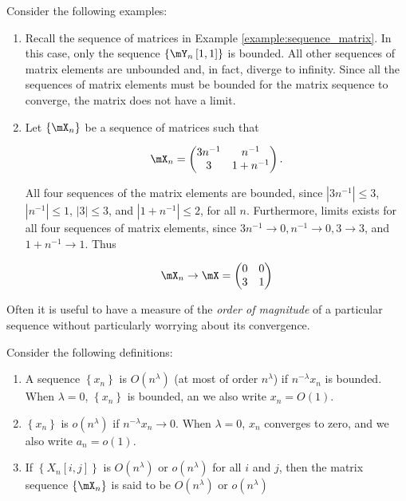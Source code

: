 \documentclass[english,12pt]{book}\usepackage[]{graphicx}\usepackage[]{xcolor}
\begin{document}
\begin{example}
Consider the following examples:
\begin{enumerate}
 \item Recall the sequence of matrices in Example \ref{example:sequence_matrix}. In this case, only the sequence $\left\lbrace \mY_n\left[1, 1\right]\right\rbrace$ is bounded. All other sequences of matrix elements are unbounded and, in fact, diverge to infinity. Since all the sequences of matrix elements must be bounded for the matrix sequence to converge, the matrix does not have a limit.
 \item Let $\left\lbrace \mX_n\right\rbrace$ be a sequence of matrices such that
 
\begin{equation*}
\mX_n = \begin{pmatrix}
  3n^{-1} & n^{-1} \\
  3       & 1 + n^{-1}
\end{pmatrix}.
\end{equation*}

All four sequences of the matrix elements are bounded, since $\left|3n^{-1}\right|\leq 3$, $\left|n^{-1}\right|\leq 1$, $\left|3\right|\leq 3$, and $\left|1 + n^{-1}\right|\leq 2$, for all $n$. Furthermore, limits exists for all four sequences of matrix elements, since $3n^{-1}\to 0, n^{-1}\to 0, 3\to 3$, and $1 + n^{-1}\to 1$. Thus 

\begin{equation*}
\mX_n\to \mX= \begin{pmatrix}
0 & 0 \\
3 & 1
\end{pmatrix}
\end{equation*}
 \end{enumerate}
\end{example}

Often it is useful to have a measure of the \emph{order of magnitude} of a particular sequence without particularly worrying about its convergence. 
\begin{definition}\label{definition:big_little_oh}
Consider the following definitions:
	\begin{enumerate}
		\item A sequence $\left\lbrace x_n \right\rbrace $ is $O(n^{\lambda})$ (at most of order $n^{\lambda}$) if $n^{-\lambda}x_n$ is bounded. When $\lambda=0$, $\left\lbrace x_n \right\rbrace $ is bounded, an we also write $x_n=O(1)$.
		\item $\left\lbrace x_n \right\rbrace $ is $o(n^{\lambda})$ if $n^{-\lambda}x_n\to 0$. When $\lambda=0$, $x_n$ converges to zero, and we also write $a_n=o(1)$.
		\item If $\left\lbrace X_n\left[i,j\right]\right\rbrace$ is $O(n^\lambda)$ or $o(n^\lambda)$ for all $i$ and $j$, then the matrix sequence $\left\lbrace \mX_n\right\rbrace$ is said to be $O(n^\lambda)$ or $o(n^\lambda)$
	\end{enumerate}
\end{definition}
\end{document}
